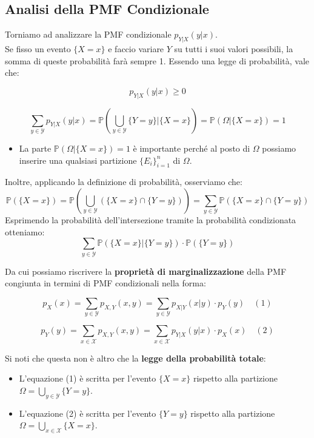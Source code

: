 \subsection{Analisi della PMF Condizionale}

Torniamo ad analizzare la PMF condizionale $p_{Y|X}(y|x)$.
\\Se fisso un evento $\{X=x\}$ e faccio variare $Y$ su tutti i suoi valori possibili, la somma di queste probabilità farà sempre 1. Essendo una legge di probabilità, vale che:

\begin{equation}
p_{Y|X}(y|x) \ge 0
\end{equation}

\begin{equation}
\sum_{y \in \mathcal{Y}} p_{Y|X}(y|x) = \mathbb{P}\left(\bigcup_{y \in \mathcal{Y}} \{Y=y\} \Big| \{X=x\}\right) = \mathbb{P}(\Omega | \{X=x\}) = 1
\end{equation}

\begin{itemize}
    \item La parte $\mathbb{P}(\Omega | \{X=x\}) = 1$ è importante perché al posto di $\Omega$ possiamo inserire una qualsiasi partizione $\{E_i\}_{i=1}^n$ di $\Omega$.
\end{itemize}

Inoltre, applicando la definizione di probabilità, osserviamo che:
\[
\mathbb{P}(\{X=x\}) = \mathbb{P}\left(\bigcup_{y \in \mathcal{Y}} (\{X=x\} \cap \{Y=y\})\right) = \sum_{y \in \mathcal{Y}} \mathbb{P}(\{X=x\} \cap \{Y=y\}) 
\]
Esprimendo la probabilità dell'intersezione tramite la probabilità condizionata otteniamo:
\[
\sum_{y \in \mathcal{Y}} \mathbb{P}(\{X=x\} | \{Y=y\}) \cdot \mathbb{P}(\{Y=y\})
\]

Da cui possiamo riscrivere la \textbf{proprietà di marginalizzazione} della PMF congiunta in termini di PMF condizionali nella forma:

\begin{equation}
p_X(x) = \sum_{y \in \mathcal{Y}} p_{X,Y}(x,y) = \sum_{y \in \mathcal{Y}} p_{X|Y}(x|y) \cdot p_Y(y) \quad (1)
\end{equation}

\begin{equation}
p_Y(y) = \sum_{x \in \mathcal{X}} p_{X,Y}(x,y) = \sum_{x \in \mathcal{X}} p_{Y|X}(y|x) \cdot p_X(x) \quad (2)
\end{equation}

Si noti che questa non è altro che la \textbf{legge della probabilità totale}:
\begin{itemize}
    \item L'equazione (1) è scritta per l'evento $\{X=x\}$ rispetto alla partizione $\Omega = \bigcup_{y \in \mathcal{Y}} \{Y=y\}$.
    \item L'equazione (2) è scritta per l'evento $\{Y=y\}$ rispetto alla partizione $\Omega = \bigcup_{x \in \mathcal{X}} \{X=x\}$.
\end{itemize}

